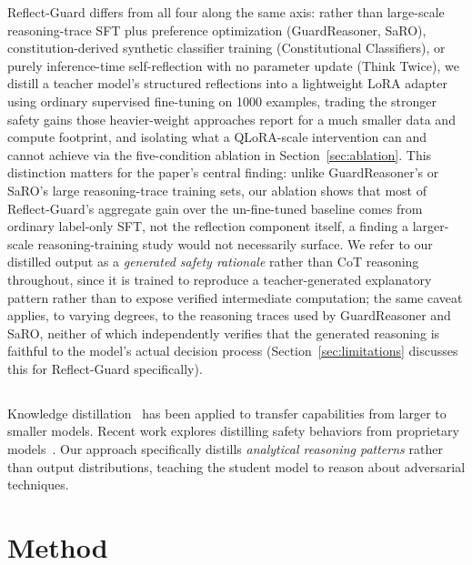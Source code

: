 \documentclass[superintelligence,article,accept,moreauthors]{Definitions/mdpi}
\begin{document}
Reflect-Guard differs from all four along the same axis: rather than large-scale reasoning-trace SFT plus preference optimization (GuardReasoner, SaRO), constitution-derived synthetic classifier training (Constitutional Classifiers), or purely inference-time self-reflection with no parameter update (Think Twice), we distill a teacher model's structured reflections into a lightweight LoRA adapter using ordinary supervised fine-tuning on 1000 examples, trading the stronger safety gains those heavier-weight approaches report for a much smaller data and compute footprint, and isolating what a QLoRA-scale intervention can and cannot achieve via the five-condition ablation in Section~\ref{sec:ablation}. This distinction matters for the paper's central finding: unlike GuardReasoner's or SaRO's large reasoning-trace training sets, our ablation shows that most of Reflect-Guard's aggregate gain over the un-fine-tuned baseline comes from ordinary label-only SFT, not the reflection component itself, a finding a larger-scale reasoning-training study would not necessarily surface. We refer to our distilled output as a \emph{generated safety rationale} rather than CoT reasoning throughout, since it is trained to reproduce a teacher-generated explanatory pattern rather than to expose verified intermediate computation; the same caveat applies, to varying degrees, to the reasoning traces used by GuardReasoner and SaRO, neither of which independently verifies that the generated reasoning is faithful to the model's actual decision process (Section~\ref{sec:limitations} discusses this for Reflect-Guard specifically).

\subsection{}
Knowledge distillation~\citep{hinton2015distilling} has been applied to transfer capabilities from larger to smaller models. Recent work explores distilling safety behaviors from proprietary \mbox{models~\citep{tunstall2023zephyr}.} Our approach specifically distills \emph{analytical reasoning patterns} rather than output distributions, teaching the student model to reason about adversarial techniques.

\section{Method}
\label{sec:method}
\end{document}
